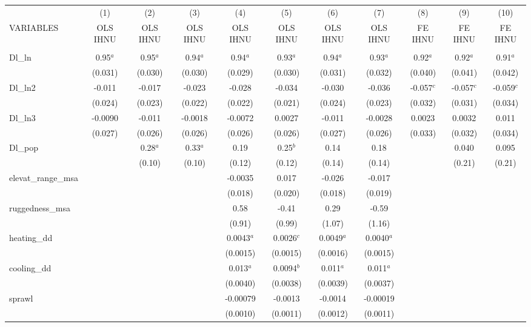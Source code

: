 \documentclass[]{article}
\begin{document}
\begin{tabular}{lcccccccccc} \hline
 & (1) & (2) & (3) & (4) & (5) & (6) & (7) & (8) & (9) & (10) \\
VARIABLES & OLS IHNU & OLS IHNU & OLS IHNU & OLS IHNU & OLS IHNU & OLS IHNU & OLS IHNU & FE IHNU & FE IHNU & FE IHNU \\ \hline
 &  &  &  &  &  &  &  &  &  &  \\
Dl\_ln & 0.95$^a$ & 0.95$^a$ & 0.94$^a$ & 0.94$^a$ & 0.93$^a$ & 0.94$^a$ & 0.93$^a$ & 0.92$^a$ & 0.92$^a$ & 0.91$^a$ \\
 & (0.031) & (0.030) & (0.030) & (0.029) & (0.030) & (0.031) & (0.032) & (0.040) & (0.041) & (0.042) \\
Dl\_ln2 & -0.011 & -0.017 & -0.023 & -0.028 & -0.034 & -0.030 & -0.036 & -0.057$^c$ & -0.057$^c$ & -0.059$^c$ \\
 & (0.024) & (0.023) & (0.022) & (0.022) & (0.021) & (0.024) & (0.023) & (0.032) & (0.031) & (0.034) \\
Dl\_ln3 & -0.0090 & -0.011 & -0.0018 & -0.0072 & 0.0027 & -0.011 & -0.0028 & 0.0023 & 0.0032 & 0.011 \\
 & (0.027) & (0.026) & (0.026) & (0.026) & (0.026) & (0.027) & (0.026) & (0.033) & (0.032) & (0.034) \\
Dl\_pop &  & 0.28$^a$ & 0.33$^a$ & 0.19 & 0.25$^b$ & 0.14 & 0.18 &  & 0.040 & 0.095 \\
 &  & (0.10) & (0.10) & (0.12) & (0.12) & (0.14) & (0.14) &  & (0.21) & (0.21) \\
elevat\_range\_msa &  &  &  & -0.0035 & 0.017 & -0.026 & -0.017 &  &  &  \\
 &  &  &  & (0.018) & (0.020) & (0.018) & (0.019) &  &  &  \\
ruggedness\_msa &  &  &  & 0.58 & -0.41 & 0.29 & -0.59 &  &  &  \\
 &  &  &  & (0.91) & (0.99) & (1.07) & (1.16) &  &  &  \\
heating\_dd &  &  &  & 0.0043$^a$ & 0.0026$^c$ & 0.0049$^a$ & 0.0040$^a$ &  &  &  \\
 &  &  &  & (0.0015) & (0.0015) & (0.0016) & (0.0015) &  &  &  \\
cooling\_dd &  &  &  & 0.013$^a$ & 0.0094$^b$ & 0.011$^a$ & 0.011$^a$ &  &  &  \\
 &  &  &  & (0.0040) & (0.0038) & (0.0039) & (0.0037) &  &  &  \\
sprawl &  &  &  & -0.00079 & -0.0013 & -0.0014 & -0.00019 &  &  &  \\
 &  &  &  & (0.0010) & (0.0011) & (0.0012) & (0.0011) &  &  &  \\

\end{tabular}
\end{document}
